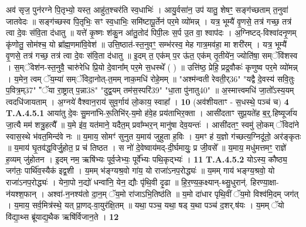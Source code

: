 \documentclass[17pt]{extarticle}
\begin{document}
                  अव॑ सृज॒ पुन॑रग्ने पि॒तृभ्यो॒ यस्त॒ आहु॑त॒श्चर॑ति स्व॒धाभिः॑ । आयु॒र्वसा॑न॒ उप॑ यातु॒ शेषꣳ॒॒ सङ्ग॑च्छताम् त॒नुवा॑ जातवेदः ॥  सङ्ग॑च्छस्व पि॒तृभिः॒ सꣳ स्व॒धाभिः॒ समि॑ष्टापू॒र्तेन॑ पर॒मे व्यो॑मन्न् ।  यत्र॒ भूम्यै॑ वृ॒णसे॒ तत्र॑ गच्छ॒ तत्र॑ त्वा दे॒वः स॑वि॒ता द॑धातु ॥ यत्ते॑ कृ॒ष्णः श॑कु॒न आ॑तु॒तोद॑ पिपी॒लः स॒र्प उ॒त वा॒ श्वाप॑दः ।  अ॒ग्निष्टद्-विश्वा॑दनृ॒णम् कृ॑णोतु॒ सोम॑श्च॒ यो ब्रा᳚ह्म॒णमा॑वि॒वेश॑ ॥ उत्ति॒ष्ठात॑-स्त॒नुवꣳ॒॒ सम्भ॑रस्व॒ मेह गात्र॒मव॑हा॒ मा शरी॑रम् ।  यत्र॒ भूम्यै॑ वृ॒णसे॒ तत्र॑ गच्छ॒ तत्र॑ त्वा दे॒वः स॑वि॒ता द॑धातु ॥ इ॒दम् त॒ एक॑म् प॒र ऊ॑त॒ एक॑म् तृ॒तीये॑न॒ ज्योति॑षा॒ सम्ॅवि॑शस्व ।  स॒म्ॅवेश॑न-स्त॒नुवै॒ चारु॑रेधि प्रि॒यो दे॒वाना᳚म् पर॒मे स॒धस्थे᳚ ( ) ॥ उत्ति॑ष्ठ॒ प्रेहि॒ प्रद्र॒वौकः॑ कृणुष्व पर॒मे व्यो॑मन्न् । य॒मेन॒ त्वम् ॅय॒म्या॑ सम्ॅविदा॒नोत्-त॒मम् नाक॒मधि॑ रोहे॒मम् ॥  "अश्म॑न्वती रेवती॒र्{36}" "यद्वै दे॒वस्य॑ सवि॒तुः प॒वित्र॒म्{37}" "ॅया रा॒ष्ट्रात् प॒न्ना{38}" "दुद्व॒यम् तम॑स॒स्परि॑{39}" "धा॒ता पु॑नातु{40}" ॥  अ॒स्मात्त्वमधि॑ जा॒तो᳚ऽस्य॒यम् त्वदधि॑जायताम् ।  अ॒ग्नये॑ वैश्वान॒राय॑ सुव॒र्गाय॑ लो॒काय॒ स्वाहा᳚ । \textbf{ 10} \newline
                  \newline
                                                        (अव॑शीयताꣳ - स॒धस्थे॒ पञ्च॑ च) \textbf{4} \newline \newline
                                \textbf{ T.A.4.5.1} \newline
                  आया॑तु दे॒वः सु॒मना॑भि-रू॒तिभि॑र्-य॒मो ह॑वे॒ह प्रय॑ताभिर॒क्ता । आसी॑दताꣳ सुप्र॒यते॑ह ब॒र्॒.हिष्यूर्जा॑य जा॒त्यै मम॑ शत्रु॒हत्यै᳚ ॥  य॒मे इ॑व॒ यत॑माने॒ यदैत॒म् प्रवा᳚म्भर॒न् मानु॑षा देव॒यन्तः॑ । आसी॑दतꣳ॒॒ स्वमु॑ लो॒कम् ॅविदा॑ने स्वास॒स्थे भ॑वत॒मिन्द॑वे नः ॥  य॒माय॒ सोमꣳ॑ सुनुत य॒माय॑ जुहुता ह॒विः ।  य॒मꣳ ह॑ य॒ज्ञो ग॑च्छत्य॒ग्निदू॑तो॒ अर॑ङ्कृतः ॥  य॒माय॑ घृ॒तव॑द्ध॒विर्जु॒होत॒ प्र च॑ तिष्ठत ।  स नो॑ दे॒वेष्वाय॑मद्-दी॒र्घमायुः॒ प्र जी॒वसे᳚ ॥  य॒माय॒ मधु॑मत्तमꣳ॒॒ राज्ञे॑ ह॒व्यम् जु॑होतन । इ॒दम् नम॒ ऋषि॑भ्यः पूर्व॒जेभ्यः॒ पूर्वे᳚भ्यः पथि॒कृद्भ्यः॑ । \textbf{ 11} \newline
                  \newline
                                                                  \textbf{ T.A.4.5.2} \newline
                  योऽस्य॒ कौष्ठ्य॒ जग॑तः॒ पार्थि॑व॒स्यैक॑ इद्व॒शी ।  य॒मम् भ॑ङ्ग्यश्र॒वो गा॑य॒ यो राजा॑ऽनप॒रोद्ध्यः॑ ॥ य॒मम् गाय॑ भङ्ग्य॒श्रवो॒ यो राजा॑ऽनप॒रोद्ध्यः॑ । येना॒पो न॒द्यो॑ धन्वा॑नि॒ येन॒ द्यौः पृ॑थि॒वी दृ॒ढा ॥ हि॒र॒ण्य॒क॒क्ष्यान्-थ्सु॒धुरान्॑. हिरण्या॒क्षा-न॑यश्श॒फान् । अश्वा॑-न॒नश्य॑तो दा॒न॒म् ॅय॒मो रा॑जाऽभि॒तिष्ठ॑ति ॥ य॒मो दा॑धार पृथि॒वीं ॅय॒मो विश्व॑मि॒दम् जग॑त् । य॒माय॒ सर्व॒मित्र॑स्थे॒ यत् प्रा॒णद्-वा॒युर॑क्षि॒तम् ॥ यथा॒ पञ्च॒ यथा॒ षड् य॒था पञ्च॑ द॒शर्.ष॑यः । य॒मम् ॅयो वि॑द्या॒थ्स ब्रू॑याद्य॒थैक ऋषि॑र्विजान॒ते । \textbf{ 12} \newline
\end{document}
